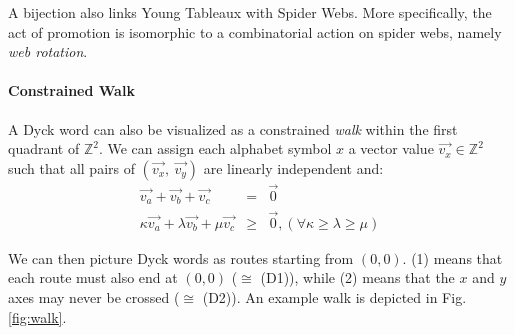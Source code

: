 \documentclass[nonatbib,numbers,10pt]{llncs}
\begin{document}
A bijection also links Young Tableaux with Spider Webs. More specifically, the act of promotion is isomorphic to a combinatorial action on spider webs, namely \textit{web rotation}\cite{petersen}.

\paragraph{\textbf{Constrained Walk}}
A Dyck word can also be visualized as a constrained \textit{walk} within the first quadrant of $\mathbb{Z}^2$. We can assign each alphabet symbol $x$ a vector value $\vec{v_x} \in \mathbb{Z}^2$ such that all pairs of $(\vec{v_x},\ \vec{v_y})$ are linearly independent and:
\begin{eqnarray}
\vec{v_a} + \vec{v_b} + \vec{v_c} &=& \vec{0} \\
\kappa\vec{v_a} + \lambda\vec{v_b} + \mu\vec{v_c} &\geq & \vec{0},  (\forall \kappa \geq \lambda \geq \mu)
\end{eqnarray}

We can then picture Dyck words as routes starting from $(0,0)$. (1) means that each route must also end at $(0,0)$ ($\cong$ (D1)), while (2) means that the $x$ and $y$ axes may never be crossed ($\cong$ (D2)). An example walk is depicted in Fig.\ref{fig:walk}.
\end{document}
